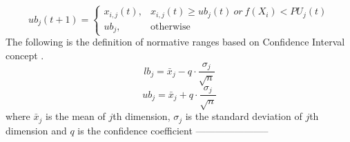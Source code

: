 \begin{equation}
ub_{j}(t+1) = \begin{cases} x_{i,j}(t), & x_{i,j}(t)\ge ub_{j}(t)\:or\:f(X_{i})<PU_{j}(t)  \\ ub_{j}, & \mbox{otherwise} \end{cases} 
\end{equation}%
The following is the definition of normative ranges based on Confidence Interval concept \cite{proakis1985probability}.
\begin{equation}
lb_{j}=\bar{x}_{j}-q\cdot\dfrac{\sigma_{j}}{\sqrt{n}}
\end{equation}
\begin{equation}
ub_{j}=\bar{x}_{j}+q\cdot\dfrac{\sigma_{j}}{\sqrt{n}}
\end{equation}
where 
$\bar{x}_{j}$ is the mean of $j$th dimension, $\sigma_{j}$ is the standard deviation of $j$th dimension and $q$ is the confidence coefficient \newline
\newline ----------------------- \newline





